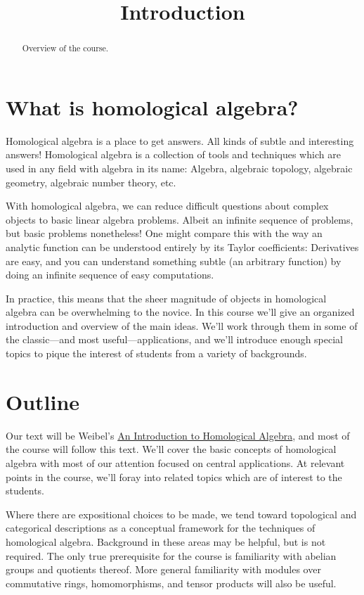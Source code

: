 \documentclass{ximera}
\title{Introduction}
\begin{document}
\begin{abstract}
Overview of the course.
\end{abstract}
\maketitle

\section{What is homological algebra?}

Homological algebra is a place to get answers. All kinds of subtle and interesting answers! Homological algebra is a collection of tools and techniques which are used in any field with algebra in its name: Algebra, algebraic topology, algebraic geometry, algebraic number theory, etc.

With homological algebra, we can reduce difficult questions about complex objects to basic linear algebra problems. Albeit an infinite sequence of problems, but basic problems nonetheless! One might compare this with the way an analytic function can be understood entirely by its Taylor coefficients: Derivatives are easy, and you can understand something subtle (an arbitrary function) by doing an infinite sequence of easy computations.

In practice, this means that the sheer magnitude of objects in homological algebra can be overwhelming to the novice. In this course we'll give an organized introduction and overview of the main ideas. We'll work through them in some of the classic—and most useful—applications, and we'll introduce enough special topics to pique the interest of students from a variety of backgrounds.



\section{Outline}

Our text will be Weibel's \href{http://www.amazon.com/gp/offer-listing/0521559871/ref=dp_olp_used?ie=UTF8&condition=used}{An Introduction to Homological Algebra}, and most of the course will follow this text. We'll cover the basic concepts of homological algebra with most of our attention focused on central applications. At relevant points in the course, we'll foray into related topics which are of interest to the students.

Where there are expositional choices to be made, we tend toward topological and categorical descriptions as a conceptual framework for the techniques of homological algebra. Background in these areas may be helpful, but is not required. The only true prerequisite for the course is familiarity with abelian groups and quotients thereof. More general familiarity with modules over commutative rings, homomorphisms, and tensor products will also be useful.
\end{document}
